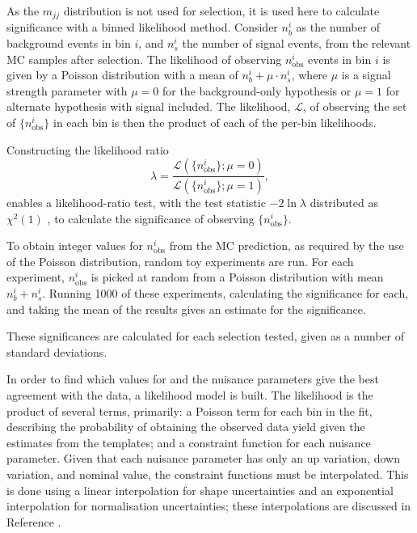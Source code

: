 


\newcommand\nobsi{\ensuremath{n_\text{obs}^i}\xspace}
As the $m_{jj}$ distribution is not used for selection, it is used here to
calculate significance with a binned likelihood method. Consider $n_b^i$ as the
number of background events in bin $i$, and $n_s^i$ the number of signal events,
from the relevant \ac{MC} samples after selection.  The likelihood of observing
\nobsi events in bin $i$ is given by a Poisson distribution with a mean of
$n_b^i + \mu\cdot n_s^i$, where $\mu$ is a signal strength parameter with
$\mu=0$ for the background-only hypothesis or $\mu=1$ for alternate hypothesis
with signal included. The likelihood, $\mathcal{L}$, of observing the set of
$\{\nobsi\}$ in each bin is then the product of each of the per-bin likelihoods.

Constructing the likelihood ratio
\begin{equation*}
  \mathscr{\lambda} = \frac{ \mathcal{L}( \{\nobsi\} ; \mu=0 ) }
                           { \mathcal{L}( \{\nobsi\} ; \mu=1 ) },
\end{equation*}
enables a likelihood-ratio test, with the test statistic $-2\ln\lambda$
distributed as $\chi^2(1)$ \cite{Wilks1938}, to calculate the significance of
observing $\{\nobsi\}$.

To obtain integer values for \nobsi from the \ac{MC} prediction, as required by
the use of the Poisson distribution, random toy experiments are run. For each
experiment, \nobsi is picked at random from a Poisson distribution with mean
$n_b^i + n_s^i$. Running 1000 of these experiments, calculating the significance
for each, and taking the mean of the results gives an estimate for the
significance.

These significances are calculated for each selection tested, given as a number
of standard deviations.

In order to find which values for \muEW and the nuisance parameters give the
best agreement with the data, a likelihood model is built. The likelihood is the
product of several terms, primarily: a Poisson term for each bin in the fit,
describing the probability of obtaining the observed data yield given the
estimates from the templates; and a constraint function for each nuisance
parameter. Given that each nuisance parameter has only an up variation, down
variation, and nominal value, the constraint functions must be interpolated.
This is done using a linear interpolation for shape uncertainties and an
exponential interpolation for normalisation uncertainties; these interpolations
are discussed in Reference \cite{Cranmer2012}.

